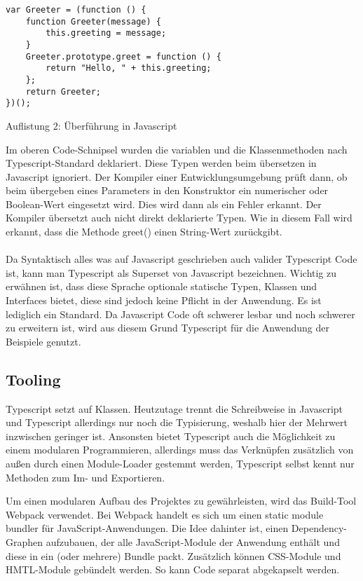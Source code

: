 \begin{lstlisting}
var Greeter = (function () {
    function Greeter(message) {
        this.greeting = message;
    }
    Greeter.prototype.greet = function () {
        return "Hello, " + this.greeting;
    };
    return Greeter;
})(); 
\end{lstlisting}

\begin{center}
    \large{Auflistung 2: Überführung in Javascript}
\end{center}

Im oberen Code-Schnipsel wurden die variablen und die Klassenmethoden nach Typescript-Standard deklariert. Diese Typen werden beim übersetzen in Javascript ignoriert. Der Kompiler einer Entwicklungsumgebung prüft dann, ob beim übergeben eines Parameters in den Konstruktor ein numerischer oder Boolean-Wert eingesetzt wird. Dies wird dann als ein Fehler erkannt. Der Kompiler übersetzt auch nicht direkt deklarierte Typen. Wie in diesem Fall wird erkannt, dass die Methode greet() einen String-Wert zurückgibt.
\\
\\
Da Syntaktisch alles was auf Javascript geschrieben auch valider Typescript Code ist, kann man Typescript als Superset von Javascript bezeichnen.
Wichtig zu erwähnen ist, dass diese Sprache optionale statische Typen, Klassen und Interfaces bietet, diese sind jedoch keine Pflicht in der Anwendung. Es ist lediglich ein Standard.
Da Javascript Code oft schwerer lesbar und noch schwerer zu erweitern ist, wird aus diesem Grund Typescript für die Anwendung der Beispiele genutzt.

\subsection{Tooling}

Typescript setzt auf Klassen. Heutzutage trennt die Schreibweise in Javascript und Typescript allerdings nur noch die Typisierung, weshalb hier der Mehrwert inzwischen geringer ist. Ansonsten bietet Typescript auch die Möglichkeit zu einem modularen Programmieren, allerdings muss das Verknüpfen zusätzlich von außen durch einen Module-Loader gestemmt werden, Typescript selbst kennt nur Methoden zum Im- und Exportieren.

Um einen modularen Aufbau des Projektes zu gewährleisten, wird das Build-Tool \glqq{}Webpack\grqq{} verwendet. Bei Webpack handelt es sich um einen \glqq{}static module bundler\grqq{} für JavaScript-Anwendungen. Die Idee dahinter ist, einen Dependency-Graphen aufzubauen, der alle JavaScript-Module der Anwendung enthält und diese in ein (oder mehrere) Bundle packt. Zusätzlich können CSS-Module und HMTL-Module gebündelt werden. So kann Code separat abgekapselt werden. 

